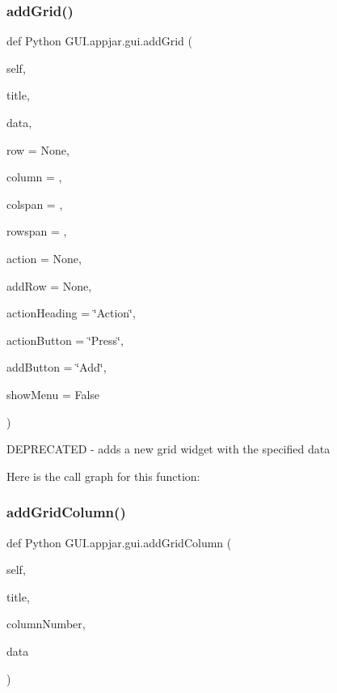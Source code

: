 \subsubsection{\texorpdfstring{add\+Grid()}{addGrid()}}
{\footnotesize\ttfamily def Python G\+U\+I.\+appjar.\+gui.\+add\+Grid (\begin{DoxyParamCaption}\item[{}]{self,  }\item[{}]{title,  }\item[{}]{data,  }\item[{}]{row = {\ttfamily None},  }\item[{}]{column = {},  }\item[{}]{colspan = {},  }\item[{}]{rowspan = {},  }\item[{}]{action = {\ttfamily None},  }\item[{}]{add\+Row = {\ttfamily None},  }\item[{}]{action\+Heading = {\ttfamily \char`\"{}Action\char`\"{}},  }\item[{}]{action\+Button = {\ttfamily \char`\"{}Press\char`\"{}},  }\item[{}]{add\+Button = {\ttfamily \char`\"{}Add\char`\"{}},  }\item[{}]{show\+Menu = {\ttfamily False} }\end{DoxyParamCaption})}

\begin{DoxyVerb}DEPRECATED - adds a new grid widget with the specified data \end{DoxyVerb}
 Here is the call graph for this function\+:
\mbox{\label{class_python_01_g_u_i_1_1appjar_1_1gui_a2d19adfd9698c71d2d9816f8253f7d2f}} 
\subsubsection{\texorpdfstring{add\+Grid\+Column()}{addGridColumn()}}
{\footnotesize\ttfamily def Python G\+U\+I.\+appjar.\+gui.\+add\+Grid\+Column (\begin{DoxyParamCaption}\item[{}]{self,  }\item[{}]{title,  }\item[{}]{column\+Number,  }\item[{}]{data }\end{DoxyParamCaption})}

